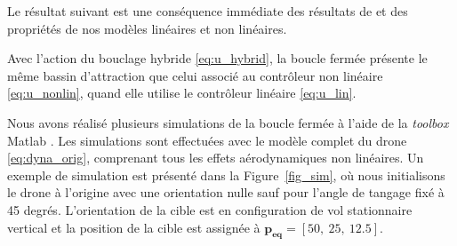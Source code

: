 Le résultat suivant est une conséquence immédiate des résultats de \cite[Ex. 1.7]{65} et des propriétés de nos modèles linéaires et non linéaires.

\begin{proposition}
    Avec l'action du bouclage hybride \eqref{eq:u_hybrid}, la boucle fermée présente le même bassin d'attraction que celui associé au contrôleur non linéaire \eqref{eq:u_nonlin}, quand elle utilise le contrôleur linéaire \eqref{eq:u_lin}.
\end{proposition}

Nous avons réalisé plusieurs simulations de la boucle fermée à l'aide de la \textit{toolbox} Matlab \cite{sanfelice_2017}. Les simulations sont effectuées avec le modèle complet du drone \eqref{eq:dyna_orig}, comprenant tous les effets aérodynamiques non linéaires. Un exemple de simulation est présenté dans la Figure~\ref{fig_sim}, où nous initialisons le drone à l'origine avec une orientation nulle sauf pour l'angle de tangage fixé à 45 degrés. L'orientation de la cible est en configuration de vol stationnaire vertical et la position de la cible est assignée à $\boldsymbol{p_{\text{eq}}} = [50,~25,~12.5]$.

